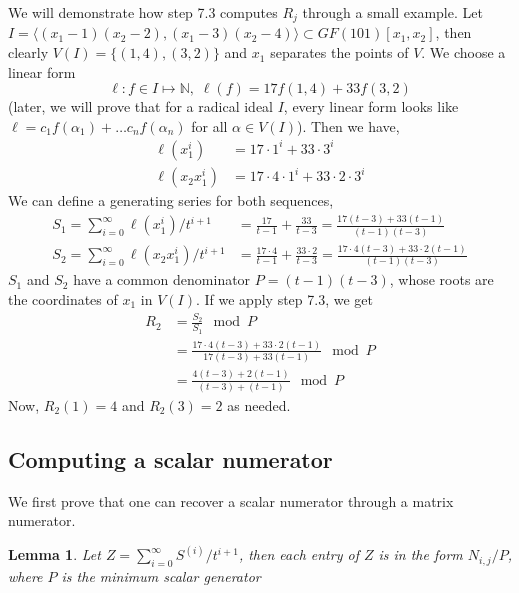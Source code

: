 \documentclass[12pt]{article}
\newtheorem{lemma}[definition]{Lemma}
\begin{document}
We will demonstrate how step 7.3 computes $R_j$ through
a small example. Let 
$I = \langle (x_1-1)(x_2-2),(x_1-3)(x_2-4)\rangle \subset
GF(101)[x_1,x_2]$, then
clearly $V(I) = \{ (1,4),(3,2) \}$ and $x_1$ separates the
points of $V$. We choose a linear form 
$$\ell: f \in I \mapsto \mathbb{N},\;\ell(f) = 17 f(1,4) + 33 f(3,2)$$
(later, we will prove that for a 
radical ideal $I$, every linear form looks like 
$\ell = c_1 f(\alpha_1) + \dots c_n f(\alpha_n) $ for all
$\alpha \in V(I)$). Then we have,
\begin{align*}
\ell(x_1^i) &= 17 \cdot 1^i + 33 \cdot 3^i\\
\ell(x_2x_1^i) &= 17 \cdot 4 \cdot 1^i + 33 \cdot 2 \cdot 3^i
\end{align*} 
We can define a generating series for both sequences,
\begin{align*}
S_1 = \sum_{i = 0}^{\infty} \ell(x^i_1) / t^{i+1}
 &= \frac{17}{t-1} + \frac{33}{t-3}
 = \frac{17(t-3)+33(t-1)}{(t-1)(t-3)} \\
S_2 = \sum_{i=0}^{\infty} \ell(x_2x^i_1)/t^{i+1} 
&= \frac{17\cdot 4}{t-1} + \frac{33 \cdot 2}{t-3}
= \frac{17\cdot 4 (t-3) + 33\cdot 2(t-1)}{(t-1)(t-3)}
\end{align*}
$S_1$ and $S_2$ have a common denominator $P = (t-1)(t-3)$,
whose roots are the coordinates of $x_1$ in $V(I)$. If we
apply step 7.3, we get
\begin{align*}
R_2 
&=\frac{S_2}{S_1} \mod P\\
 &= 
\frac{17\cdot 4 (t-3) + 33\cdot 2(t-1)}{17(t-3)+33(t-1)} \mod P\\
&=\frac{4 (t-3) + 2(t-1)}{(t-3)+(t-1)} \mod P
\end{align*}
Now, $ R_2(1) = 4$ and $R_2(3) = 2$ as needed.

\subsection{Computing a scalar numerator}
We first prove that one can recover a scalar numerator
through a matrix numerator.
\begin{lemma}\label{gen}
	Let $Z = \sum_{i=0}^{\infty} S^{(i)}/t^{i+1}$, then each
	entry of $Z$ is in the form $N_{i,j}/P$, where $P$ is
	the minimum scalar generator
\end{lemma} 
\end{document}
